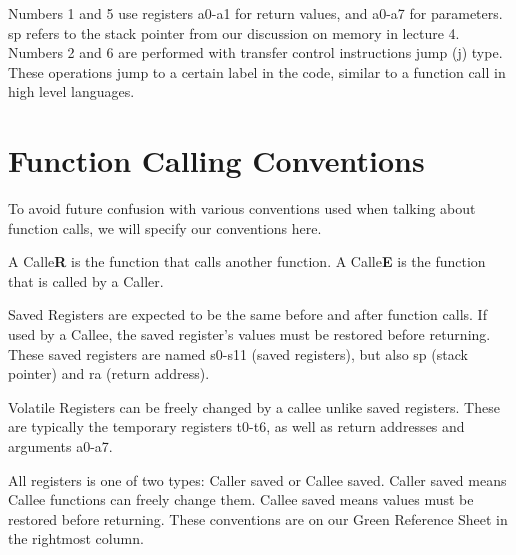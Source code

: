 \documentclass[letterpaper]{article}
\theoremstyle{remark}
\begin{document}
Numbers 1 and 5 use registers a0-a1 for return values, and a0-a7 for parameters. sp refers to the stack pointer from our discussion on memory in lecture 4. Numbers 2 and 6 are performed with transfer control instructions jump (j) type. These operations jump to a certain label in the code, similar to a function call in high level languages.

\section{Function Calling Conventions}
To avoid future confusion with various conventions used when talking about function calls, we will specify our conventions here.

A Calle\textbf{R} is the function that calls another function. A Calle\textbf{E} is the function that is called by a Caller.

Saved Registers are expected to be the same before and after function calls. If used by a Callee, the saved register's values must be restored before returning. These saved registers are named s0-s11 (saved registers), but also sp (stack pointer) and ra (return address).

Volatile Registers can be freely changed by a callee unlike saved registers. These are typically the temporary registers t0-t6, as well as return addresses and arguments a0-a7.

All registers is one of two types: Caller saved or Callee saved. Caller saved means Callee functions can freely change them. Callee saved means values must be restored before returning. These conventions are on our Green Reference Sheet in the rightmost column.
\end{document}

